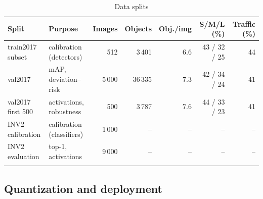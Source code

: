 \documentclass[pdflatex,sn-mathphys-num]{sn-jnl}%
\theoremstyle{thmstyleone}%
\theoremstyle{thmstyletwo}%
\theoremstyle{thmstylethree}%
\begin{document}
\begin{table}[htbp]
\footnotesize\setlength{\tabcolsep}{4pt}
\caption{Data splits}\label{tab:datasets}
\begin{tabular}{@{}llrrrrr@{}}
\toprule
Split & Purpose & Images & Objects & Obj./img & S/M/L (\%) & Traffic (\%) \\
\midrule
train2017 subset & calibration (detectors) & 512 & 3\,401 & 6.6 & 43 / 32 / 25 & 44 \\
val2017 & mAP, deviation--risk & 5\,000 & 36\,335 & 7.3 & 42 / 34 / 24 & 41 \\
val2017 first 500 & activations, robustness & 500 & 3\,787 & 7.6 & 44 / 33 / 23 & 41 \\
INV2 calibration & calibration (classifiers) & 1\,000 & -- & -- & -- & -- \\
INV2 evaluation & top-1, activations & 9\,000 & -- & -- & -- & -- \\
\botrule
\end{tabular}
\end{table}

\subsection{Quantization and deployment}\label{sec:quant}
\end{document}
